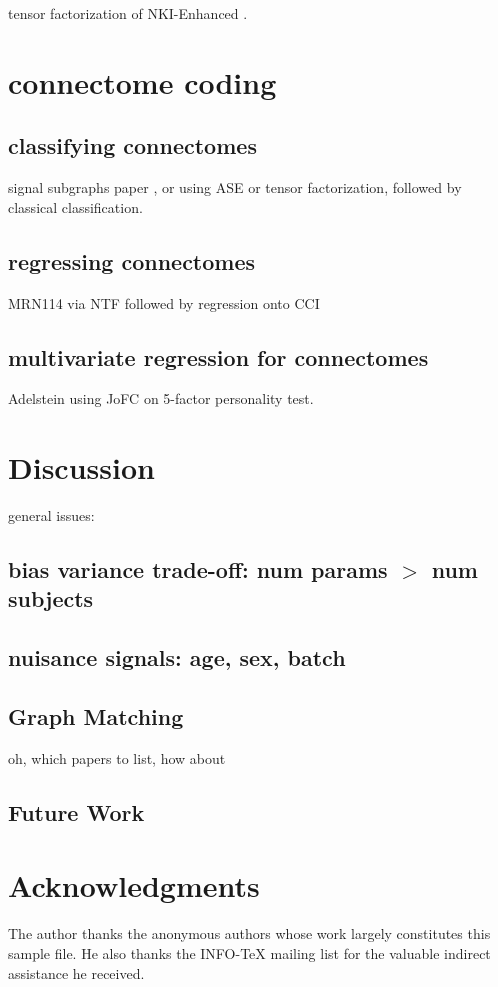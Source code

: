 \documentclass[final,leqno]{article}
\begin{document}
tensor factorization of NKI-Enhanced \cite{Lee13a,Lee14a,Lee14b}.

\section{connectome coding}


\subsection{classifying connectomes}

signal subgraphs paper \cite{signal-subgraph}, or using ASE or tensor factorization, followed by classical classification.

\subsection{regressing connectomes}

MRN114 via NTF followed by regression onto CCI

\subsection{multivariate regression for connectomes}

Adelstein \cite{Adelstein2011a} using JoFC on 5-factor personality test.


\section{Discussion}

general issues:

\subsection{bias variance trade-off: num params $>$ num subjects}

\subsection{nuisance signals: age, sex, batch}

\subsection{Graph Matching}

oh, which papers to list, how about \cite{VP11_FAQ,Fishkind2012a,sgm-jofc,Lyzinski2013}

\subsection{Future Work}


\section*{Acknowledgments}
The author thanks the anonymous authors whose work largely
constitutes this sample file. He also thanks the INFO-TeX mailing
list for the valuable indirect assistance he received.
 
 


\end{document}
